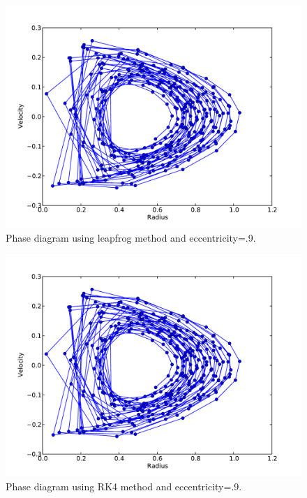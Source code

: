 \documentclass[a4paper,11pt]{article}
\begin{document}
\begin{figure}[h!]
\begin{center}
\includegraphics[scale=.7]{R_V_3lf.pdf}
\caption{Phase diagram using leapfrog method and eccentricity=.9.}
\end{center}
\end{figure}

\begin{figure}[h!]
\begin{center}
\includegraphics[scale=.7]{R_V_3rk4.pdf}
\caption{Phase diagram using RK4 method and eccentricity=.9.}
\end{center}
\end{figure}
\end{document}
